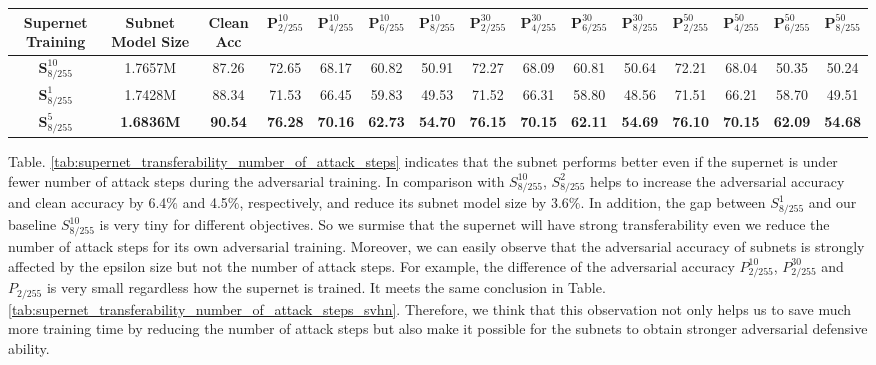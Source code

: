 \documentclass[journal]{IEEEtran}
\begin{document}
\begin{table*}[ht]
    \centering
    \setlength{\tabcolsep}{0.5mm}
    \caption{Supernet Transferability on Number of Attack Steps with the term of accuracy on SVHN (\%)}
    \begin{tabular}{c|c|c|cccccccccccc}
    Supernet Training& Subnet Model Size & Clean Acc & $\textbf{P}_{2/255}^{10}$ & $\textbf{P}_{4/255}^{10}$ & $\textbf{P}_{6/255}^{10}$ & $\textbf{P}_{8/255}^{10}$ & $\textbf{P}_{2/255}^{30}$ & $\textbf{P}_{4/255}^{30}$ & $\textbf{P}_{6/255}^{30}$ & $\textbf{P}_{8/255}^{30}$ & $\textbf{P}_{2/255}^{50}$ & $\textbf{P}_{4/255}^{50}$ & $\textbf{P}_{6/255}^{50}$ & $\textbf{P}_{8/255}^{50}$\\
    \hline
    $\textbf{S}_{8/255}^{10}$ & 1.7657M & 87.26 & 72.65 & 68.17 & 60.82 & 50.91 & 72.27 & 68.09 & 60.81 & 50.64 & 72.21 & 68.04 & 50.35 & 50.24 \\
    \hline
    $\textbf{S}_{8/255}^{1}$ & 1.7428M & 88.34 & 71.53 & 66.45 & 59.83 & 49.53 & 71.52 & 66.31 & 58.80 & 48.56 & 71.51 & 66.21 & 58.70 & 49.51 \\
    \hline
    $\textbf{S}_{8/255}^{5}$ & \textbf{1.6836M} & \textbf{90.54} & \textbf{76.28} & \textbf{70.16} & \textbf{62.73}  & \textbf{54.70} &  \textbf{76.15}  & \textbf{70.15}  & \textbf{62.11} & \textbf{54.69} & \textbf{76.10} & \textbf{70.15} & \textbf{62.09} & \textbf{54.68} \\
    \hline
    \end{tabular}\label{tab:supernet_transferability_number_of_attack_steps_svhn}
\end{table*}

Table. \ref{tab:supernet_transferability_number_of_attack_steps} indicates that the subnet performs better even if the supernet is under fewer number of attack steps during the adversarial training. In comparison with $S_{8/255}^{10}$, $S_{8/255}^{2}$ helps to increase the adversarial accuracy and clean accuracy by 6.4$\%$ and 4.5$\%$, respectively, and reduce its subnet model size by 3.6$\%$. In addition, the gap between $S_{8/255}^{1}$ and our baseline $S_{8/255}^{10}$ is very tiny for different objectives. So we surmise that the supernet will have strong transferability even we reduce the number of attack steps for its own adversarial training. Moreover, we can easily observe that the adversarial accuracy of subnets is strongly affected by the epsilon size but not the number of attack steps. For example, the difference of the adversarial accuracy $P_{2/255}^{10}$, $P_{2/255}^{30}$ and  $P_{2/255}$ is very small regardless how the supernet is trained. It meets the same conclusion in Table. \ref{tab:supernet_transferability_number_of_attack_steps_svhn}. Therefore, we think that this observation not only helps us to save much more training time by reducing the number of attack steps but also make it possible for the subnets to obtain stronger adversarial defensive ability.
\end{document}
